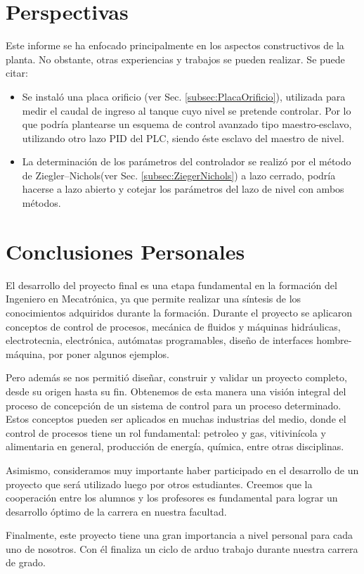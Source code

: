 \section{Perspectivas}
\label{sec:Perspectivas}
Este informe se ha enfocado principalmente en los aspectos constructivos
de la planta.
No obstante, otras experiencias y trabajos se pueden realizar. Se puede citar:
\begin{itemize}
\item Se instaló una placa orificio (ver Sec. \ref{subsec:PlacaOrificio}), 
utilizada
para medir el caudal de ingreso al tanque cuyo nivel se pretende controlar. Por 
lo que podría plantearse un esquema de control avanzado tipo maestro-esclavo, 
utilizando otro lazo PID del PLC, siendo éste esclavo del maestro de nivel. 
\item La determinación de los parámetros del controlador se realizó por 
el método de Ziegler–Nichols(ver Sec. \ref{subsec:ZiegerNichols}) a lazo 
cerrado, podría hacerse a lazo abierto y cotejar los parámetros del lazo de 
nivel con ambos métodos.
\end{itemize}

\section{Conclusiones Personales}
\label{sec:ConclusionPersonal}


El desarrollo del proyecto final es una etapa fundamental en la formación del
Ingeniero en Mecatrónica, ya que permite realizar una síntesis de los
conocimientos adquiridos durante la formación.
Durante el proyecto se aplicaron conceptos de control de
procesos, mecánica de fluidos y máquinas hidráulicas, electrotecnia,
electrónica, autómatas programables, diseño de interfaces hombre-máquina, por 
poner algunos ejemplos.

Pero además se nos permitió diseñar, construir y validar un proyecto completo,
desde su origen hasta su fin.
Obtenemos de esta manera una visión integral del proceso de concepción de un
sistema de control para un proceso determinado.
Estos conceptos pueden ser aplicados en muchas industrias del medio, donde el
control de procesos tiene un rol fundamental: petroleo y gas, vitivinícola y
alimentaria en general, producción de energía, química, entre otras disciplinas.

Asimismo, consideramos muy importante haber participado en el desarrollo de un
proyecto que será utilizado luego por otros estudiantes.
Creemos que la cooperación entre los alumnos y los profesores es fundamental
para lograr un desarrollo óptimo de la carrera en nuestra facultad.

Finalmente, este proyecto tiene una gran importancia a nivel personal para cada
uno de nosotros.
Con él finaliza un ciclo de arduo trabajo durante nuestra
carrera de grado.

